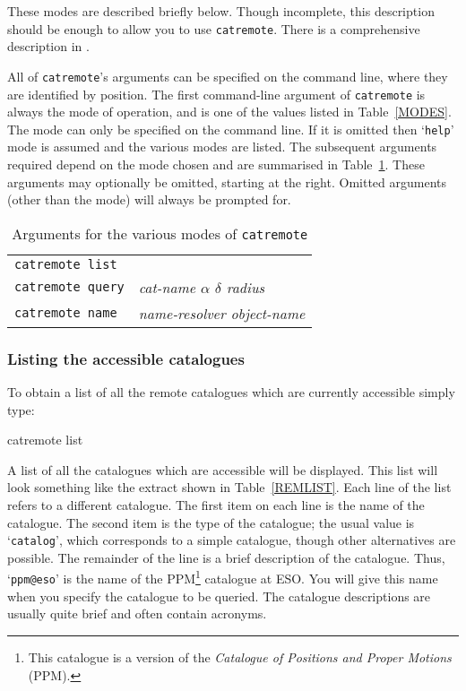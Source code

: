 \documentclass[twoside,11pt]{starlink}
\begin{document}
These modes are described briefly below.  Though incomplete, this
description should be enough to allow you to use \texttt{catremote}.  There
is a comprehensive description in \cite{SSN76}.

All of \texttt{catremote}'s arguments can be specified on the command line,
where they are identified by position.  The first command-line argument of
\texttt{catremote} is always the mode of operation, and is one of the values
listed in Table~\ref{MODES}.  The mode can only be specified on the
command line.  If it is omitted then `\texttt{help}' mode is assumed and the
various modes are listed.  The subsequent arguments required depend on the
mode chosen and are summarised in Table~\ref{ARGS}.  These arguments may
optionally be omitted, starting at the right.  Omitted arguments (other
than the mode) will always be prompted for.

\begin{table}[htbp]

\begin{center}
\begin{tabular}{ll}
\texttt{catremote list}    & \\
\texttt{catremote query}   & \textit{cat-name $\alpha$ $\delta$ radius} \\
\texttt{catremote name}    & \textit{name-resolver object-name} \\
\end{tabular}
\end{center}

\caption{Arguments for the various modes of \texttt{catremote}
\label{ARGS} }

\end{table}

\subsubsection{Listing the accessible catalogues  \label{REMLISTS} }

To obtain a list of all the remote catalogues which are currently
accessible simply type:

\begin{terminalv}
catremote  list
\end{terminalv}

A list of all the catalogues which are accessible will be displayed.  This
list will look something like the extract shown in Table~\ref{REMLIST}.
Each line of the list refers to a different catalogue.  The first item
on each line is the name of the catalogue.  The second item is the type
of the catalogue; the usual value is `\texttt{catalog}', which corresponds
to a simple catalogue, though other alternatives are possible.
The remainder of the line is a brief description of the catalogue.  Thus,
`\texttt{ppm@eso}' is the name of the PPM\footnote{This catalogue is a version
of the \textit{Catalogue of Positions and Proper Motions}\,
(PPM)\cite{PPMN,PPMS}.}
catalogue at ESO.  You will give this name  when you specify the catalogue
to be queried.  The catalogue descriptions are usually quite
brief and often contain acronyms.
\end{document}
